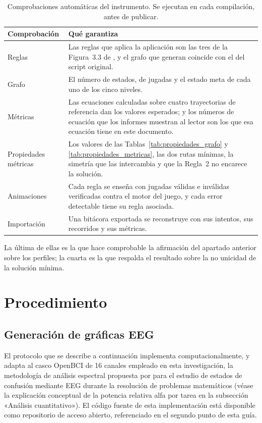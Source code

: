 \documentclass{book}
\begin{document}
\begin{table}[H]
\centering
\caption{Comprobaciones automáticas del instrumento. Se ejecutan en cada
compilación, antes de publicar.}
\label{tab:auditorias}
\renewcommand{\arraystretch}{1.3}
\begin{tabular}{|p{3.2cm}|p{7.6cm}|}
\hline
\textbf{Comprobación} & \textbf{Qué garantiza} \\
\hline
Reglas & Las reglas que aplica la aplicación son las tres de la Figura~3.3 de \citet{LievanoMolina2022}, y el grafo que generan coincide con el del script original. \\
\hline
Grafo & El número de estados, de jugadas y el estado meta de cada uno de los cinco niveles. \\
\hline
Métricas & Las ecuaciones calculadas sobre cuatro trayectorias de referencia dan los valores esperados; y los números de ecuación que los informes muestran al lector son los que esa ecuación tiene en este documento. \\
\hline
Propiedades métricas & Los valores de las Tablas~\ref{tab:propiedades_grafo} y \ref{tab:propiedades_metricas}, las dos rutas mínimas, la simetría que las intercambia y que la Regla~2 no encarece la solución. \\
\hline
Animaciones & Cada regla se enseña con jugadas válidas e inválidas verificadas contra el motor del juego, y cada error detectable tiene su regla asociada. \\
\hline
Importación & Una bitácora exportada se reconstruye con sus intentos, sus recorridos y sus métricas. \\
\hline
\end{tabular}
\end{table}

La última de ellas es la que hace comprobable la afirmación del apartado
anterior sobre los perfiles; la cuarta es la que respalda el resultado
sobre la no unicidad de la solución mínima.

\section{Procedimiento}
\subsection{Generación de gráficas EEG}

El protocolo que se describe a continuación implementa computacionalmente, y adapta al casco OpenBCI de 16 canales empleado en esta investigación, la metodología de análisis espectral propuesta por \citet{Liang2018} para el estudio de estados de confusión mediante EEG durante la resolución de problemas matemáticos (véase la explicación conceptual de la potencia relativa alfa por tarea en la subsección «Análisis cuantitativo»). El código fuente de esta implementación está disponible como repositorio de acceso abierto, referenciado en el segundo punto de esta guía.
\end{document}
